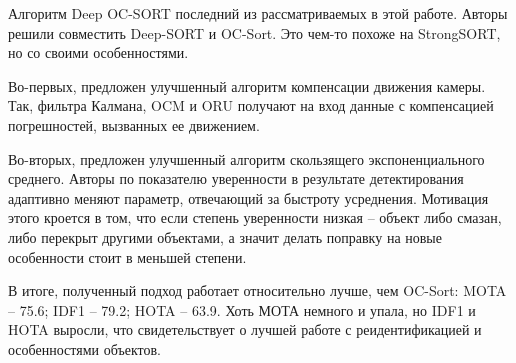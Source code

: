 Алгоритм Deep OC-SORT \cite{maggiolino2023deep} последний из рассматриваемых в этой работе. 
Авторы решили совместить Deep-SORT и OC-Sort. Это чем-то похоже на StrongSORT, но со своими особенностями. 

Во-первых, предложен улучшенный алгоритм компенсации движения камеры. Так, фильтра Калмана, OCM и ORU получают на вход данные с компенсацией погрешностей, вызванных ее движением. 

Во-вторых, предложен улучшенный алгоритм скользящего экспоненциального среднего. Авторы по показателю уверенности в результате детектирования адаптивно меняют параметр, отвечающий за быстроту усреднения. Мотивация этого кроется в том, что если степень уверенности низкая -- объект либо смазан, либо перекрыт другими объектами, а значит делать поправку на новые особенности стоит в меньшей степени.

В итоге, полученный подход работает относительно лучше, чем OC-Sort: MOTA -- 75.6; IDF1 -- 79.2; HOTA -- 63.9. Хоть МОТА немного и упала, но IDF1 и HOTA выросли, что свидетельствует о лучшей работе с реидентификацией и особенностями объектов.

